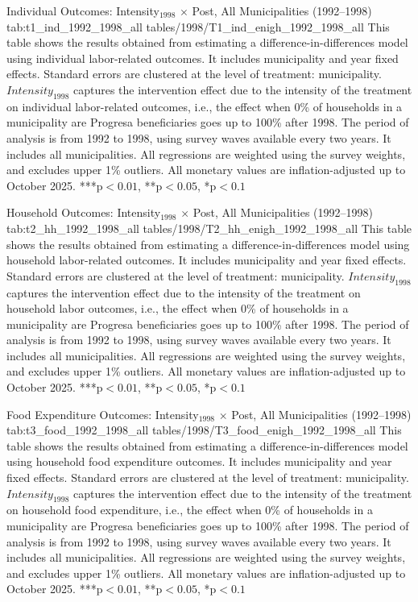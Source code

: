
\mectable%
  {Individual Outcomes: Intensity$_{1998}$ $\times$ Post, All Municipalities (1992--1998)}%
  {tab:t1_ind_1992_1998_all}%
  {tables/1998/T1_ind_enigh_1992_1998_all}%
  {This table shows the results obtained from estimating a difference-in-differences model using individual labor-related outcomes. It includes municipality and year fixed effects. Standard errors are clustered at the level of treatment: municipality. $Intensity_{1998}$ captures the intervention effect due to the intensity of the
treatment on individual labor-related outcomes, i.e., the effect when 0\% of households in a municipality are Progresa beneficiaries goes up to 100\% after 1998. The period of analysis is from 1992 to 1998, using survey waves available every two years. It includes all municipalities. All regressions are weighted using the survey weights, and excludes upper 1\% outliers. All monetary values are inflation-adjusted up to October 2025. ***p$<0.01$, **p$<0.05$, *p$<0.1$}%

\mectable%
  {Household Outcomes: Intensity$_{1998}$ $\times$ Post, All Municipalities (1992--1998)}%
  {tab:t2_hh_1992_1998_all}%
  {tables/1998/T2_hh_enigh_1992_1998_all}%
  {This table shows the results obtained from estimating a difference-in-differences model using household labor-related outcomes. It includes municipality and year fixed effects. Standard errors are clustered at the level of treatment: municipality. $Intensity_{1998}$ captures the intervention effect due to the intensity of the treatment on household labor outcomes, i.e., the effect when 0\% of households in a municipality are Progresa beneficiaries goes up to 100\% after 1998. The period of analysis is from 1992 to 1998, using survey waves available every two years. It includes all municipalities. All regressions are weighted using the survey weights, and excludes upper 1\% outliers. All monetary values are inflation-adjusted up to October 2025. ***p$<0.01$, **p$<0.05$, *p$<0.1$}%


\mectable%
  {Food Expenditure Outcomes: Intensity$_{1998}$ $\times$ Post, All Municipalities (1992--1998)}%
  {tab:t3_food_1992_1998_all}%
  {tables/1998/T3_food_enigh_1992_1998_all}%
  {This table shows the results obtained from estimating a difference-in-differences model using household food expenditure outcomes. It includes municipality and year fixed effects. Standard errors are clustered at the level of treatment: municipality. $Intensity_{1998}$ captures the intervention effect due to the intensity of the treatment on household food expenditure, i.e., the effect when 0\% of households in a municipality are Progresa beneficiaries goes up to 100\% after 1998. The period of analysis is from 1992 to 1998, using survey waves available every two years. It includes all municipalities. All regressions are weighted using the survey weights, and excludes upper 1\% outliers. All monetary values are inflation-adjusted up to October 2025. ***p$<0.01$, **p$<0.05$, *p$<0.1$}%


